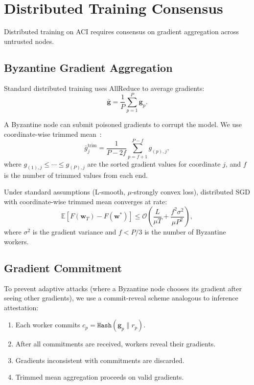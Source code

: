 \section{Distributed Training Consensus}

\label{sec:training}

Distributed training on ACI requires consensus on gradient aggregation across
untrusted nodes.

\subsection{Byzantine Gradient Aggregation}

Standard distributed training uses AllReduce to average gradients:
\begin{equation}
\bar{\mathbf{g}} = \frac{1}{P} \sum_{p=1}^{P} \mathbf{g}_p.
\end{equation}

A Byzantine node can submit poisoned gradients to corrupt the model. We use
coordinate-wise trimmed mean~\cite{byzmean}:
\begin{equation}
\bar{g}_j^{\text{trim}} = \frac{1}{P - 2f}
\sum_{p=f+1}^{P-f} g_{(p),j},
\end{equation}
where $g_{(1),j} \leq \cdots \leq g_{(P),j}$ are the sorted gradient values
for coordinate $j$, and $f$ is the number of trimmed values from each end.

\begin{theorem}
Under standard assumptions (L-smooth, $\mu$-strongly convex loss), distributed
SGD with coordinate-wise trimmed mean converges at rate:
\begin{equation}
\mathbb{E}[F(\mathbf{w}_T) - F(\mathbf{w}^*)] \leq
\mathcal{O}\!\left(\frac{L}{\mu T} + \frac{f^2 \sigma^2}{\mu P^2}\right),
\end{equation}
where $\sigma^2$ is the gradient variance and $f < P/3$ is the number of
Byzantine workers.
\end{theorem}

\subsection{Gradient Commitment}

To prevent adaptive attacks (where a Byzantine node chooses its gradient after
seeing other gradients), we use a commit-reveal scheme analogous to inference
attestation:
\begin{enumerate}[leftmargin=1.4em]
    \item Each worker commits $c_p = \texttt{Hash}(\mathbf{g}_p \| r_p)$.
    \item After all commitments are received, workers reveal their gradients.
    \item Gradients inconsistent with commitments are discarded.
    \item Trimmed mean aggregation proceeds on valid gradients.
\end{enumerate}

